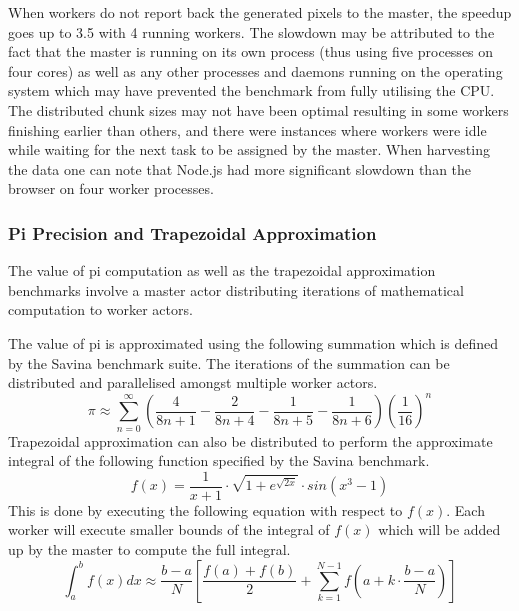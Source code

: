 \documentclass[12pt, a4paper]{report}
\theoremstyle{definition}
\theoremstyle{definition}%
\theoremstyle{definition}%
\theoremstyle{definition}%
\theoremstyle{definition}%
\theoremstyle{definition}%
\begin{document}
When workers do not report back the generated pixels to the master, the speedup goes up to 3.5 with 4 running workers. The slowdown may be attributed to the fact that the master is running on its own process (thus using five processes on four cores) as well as any other processes and daemons running on the operating system which may have prevented the benchmark from fully utilising the CPU. The distributed chunk sizes may not have been optimal resulting in some workers finishing earlier than others, and there were instances where workers were idle while waiting for the next task to be assigned by the master. When harvesting the data one can note that Node.js had more significant slowdown than the browser on four worker processes.
\subsubsection{Pi Precision and Trapezoidal Approximation}
The value of pi computation as well as the trapezoidal approximation benchmarks involve a master actor distributing iterations of mathematical computation to worker actors.

The value of pi is approximated using the following summation which is defined by the Savina benchmark suite. The iterations of the summation can be distributed and parallelised amongst multiple worker actors.
\begin{equation}
\pi\approx\sum_{n=0}^{\infty}(\frac{4}{8n+1}-\frac{2}{8n+4}-\frac{1}{8n+5}-\frac{1}{8n+6})(\frac{1}{16})^n
\end{equation}
Trapezoidal approximation can also be distributed to perform the approximate integral of the following function specified by the Savina benchmark.
\begin{equation}
f(x)=\frac{1}{x+1}\cdot\sqrt{1+e^{\sqrt{2x}}}\cdot sin(x^3-1)
\end{equation}
This is done by executing the following equation with respect to $f(x)$. Each worker will execute smaller bounds of the integral of $f(x)$ which will be added up by the master to compute the full integral.
\begin{equation}
\int_{a}^{b}f(x)dx\approx\frac{b-a}{N}\left[ \frac{f(a)+f(b)}{2}+\sum_{k=1}^{N-1}f\left( a+k\cdot\frac{b-a}{N} \right) \right]
\end{equation}
\end{document}
